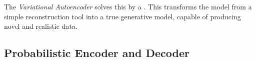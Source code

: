 
The \emph{Variational Autoencoder } \citep{kingma2013auto}  solves this by  a . This transforms the model from a simple reconstruction tool into a true generative model, capable of producing novel and realistic data.



\subsection{Probabilistic Encoder and Decoder}

